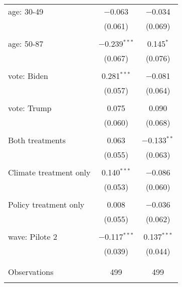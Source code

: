 \begin{tabular}{@{\extracolsep{5pt}}lcc}
 age: 30-49 & $-$0.063 & $-$0.034 \\ 
  & (0.061) & (0.069) \\ 
  & & \\ 
 age: 50-87 & $-$0.239$^{***}$ & 0.145$^{*}$ \\ 
  & (0.067) & (0.076) \\ 
  & & \\ 
 vote: Biden & 0.281$^{***}$ & $-$0.081 \\ 
  & (0.057) & (0.064) \\ 
  & & \\ 
 vote: Trump & 0.075 & 0.090 \\ 
  & (0.060) & (0.068) \\ 
  & & \\ 
 Both treatments & 0.063 & $-$0.133$^{**}$ \\ 
  & (0.055) & (0.063) \\ 
  & & \\ 
 Climate treatment only & 0.140$^{***}$ & $-$0.086 \\ 
  & (0.053) & (0.060) \\ 
  & & \\ 
 Policy treatment only & 0.008 & $-$0.036 \\ 
  & (0.055) & (0.062) \\ 
  & & \\ 
 wave: Pilote 2 & $-$0.117$^{***}$ & 0.137$^{***}$ \\ 
  & (0.039) & (0.044) \\ 
  & & \\ 
\hline \\[-1.8ex] 

Observations & 499 & 499 \\ 
\hline 
\hline \\[-1.8ex] 
\end{tabular} 
